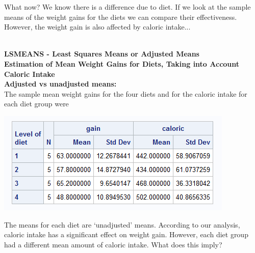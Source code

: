 What now?  We know there is a difference due to diet.  If we look at the sample means of the weight gains for the diets we can compare their effectiveness.  However, the weight gain is also affected by caloric intake...\\~\\

\newpage

\Large\textbf{LSMEANS - Least Squares Means or Adjusted Means}\large\\
\textbf{Estimation of Mean Weight Gains for Diets, Taking into Account Caloric Intake}\\

\textbf{Adjusted vs unadjusted means:}\\
The sample mean weight gains for the four diets and for the caloric intake for each diet group were
\begin{center}
\includegraphics{DietsMeans}
\end{center}

The means for each diet are `unadjusted' means.  According to our analysis, caloric intake has a significant effect on weight gain.  However, each diet group had a different mean amount of caloric intake.  What does this imply?\\~\\~\\~\\~\\~\\~\\~\\~\\~\\~\\

